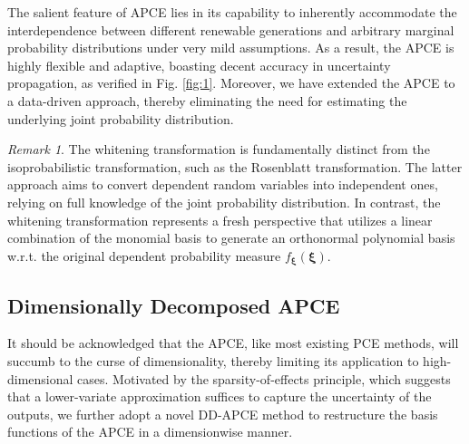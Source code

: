\documentclass[journal]{IEEEtran}
\theoremstyle{definition}
\theoremstyle{remark}
\newtheorem{remark}{Remark}
\begin{document}
The salient feature of APCE lies in its capability to inherently accommodate the interdependence between different renewable generations and arbitrary marginal probability distributions under very mild assumptions. As a result, the APCE is highly flexible and adaptive, boasting decent accuracy in uncertainty propagation, as verified in Fig. \ref{fig:1}. Moreover, we have extended the APCE to a data-driven approach, thereby eliminating the need for estimating the underlying joint probability distribution. 
\begin{remark}
The whitening transformation is fundamentally distinct from the isoprobabilistic transformation, such as the Rosenblatt transformation. The latter approach aims to convert dependent random variables into independent ones, relying on full knowledge of the joint probability distribution. In contrast, the whitening transformation represents a fresh perspective that utilizes a linear combination of the monomial basis to generate an orthonormal polynomial basis w.r.t. the original dependent probability measure $f_{\boldsymbol{\xi}}(\boldsymbol{\xi})$.
\end{remark}
\subsection{Dimensionally Decomposed APCE}\label{DD-APCE}
It should be acknowledged that the APCE, like most existing PCE methods, will succumb to the curse of dimensionality, thereby limiting its application to high-dimensional cases. Motivated by the sparsity-of-effects principle, which suggests that a lower-variate approximation suffices to capture the uncertainty of the outputs, we further adopt a novel DD-APCE method \cite{lee2023high} to restructure the basis functions of the APCE in a dimensionwise manner.
\end{document}
